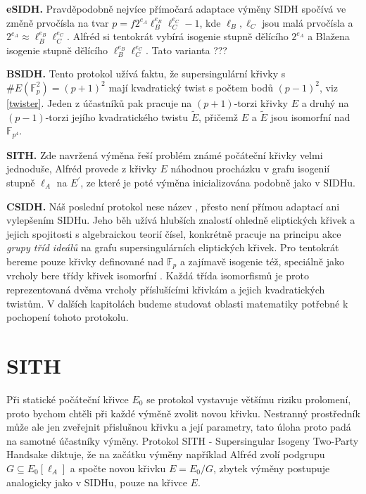 \documentclass[12pt]{report}
\begin{document}
\textbf{eSIDH.} \cite{eSIDH} Pravděpodobně nejvíce přímočará adaptace výměny SIDH spočívá ve změně prvočísla na tvar $p = f 2^{e_A} \ell_B ^{e_B} \ell_C ^{e_C} - 1$, kde $\ell_B,\ell_C$ jsou malá prvočísla a $2^{e_A} \approx \ell_B ^{e_B} \ell_C ^{e_C}$. Alfréd si tentokrát vybírá isogenie stupně dělícího $2^{e_A}$ a Blažena isogenie stupně dělícího $\ell_B ^{e_B} \ell_C ^{e_C}$. Tato varianta ???

\textbf{BSIDH.} \cite{BSIDH} Tento protokol užívá faktu, že supersingulární křivky s $\#E(\mathbb{F}_p^2) = (p+1)^2$ mají kvadratický twist s počtem bodů $(p-1)^2$, viz \ref{twister}. Jeden z účastníků pak pracuje na $(p+1)$-torzi křivky $E$ a druhý na $(p-1)$-torzi jejího kvadratického twistu $\tilde{E}$, přičemž $E$ a $\tilde{E}$ jsou isomorfní nad $\mathbb{F}_{p^4}$.

\textbf{SITH.} \cite{Dark} Zde navržená výměna řeší problém známé počáteční křivky velmi jednoduše, Alfréd provede z křivky $E$ náhodnou procházku v grafu isogenií stupně $\ell_A$ na $E^\prime$, ze které je poté výměna inicializována podobně jako v SIDHu.

\textbf{CSIDH.} \cite{CSIDH} Náš poslední protokol nese název , přesto není přímou adaptací ani vylepšením SIDHu. Jeho běh užívá hlubších znalostí ohledně eliptických křivek a jejich spojitosti s algebraickou teorií čísel, konkrétně pracuje na principu akce \textit{grupy tříd ideálů} na grafu supersingulárních eliptických křivek. Pro tentokrát bereme pouze křivky definované nad $\mathbb{F}_p$ a zajímavě isogenie též, speciálně jako vrcholy bere třídy křivek isomorfní . Každá třída isomorfismů je proto reprezentovaná dvěma vrcholy příslušícími křivkám a jejich kvadratických twistům. V dalších kapitolách budeme studovat oblasti matematiky potřebné k pochopení tohoto protokolu.

\section{SITH}

Při statické počáteční křivce $E_0$ se protokol vystavuje většímu riziku prolomení, proto bychom chtěli při každé výměně zvolit novou křivku. Nestranný prostředník může ale jen zveřejnit přislušnou křivku a její parametry, tato úloha proto padá na samotné účastníky výměny. Protokol SITH - Supersingular Isogeny Two-Party Handsake diktuje, že na začátku výměny například Alfréd zvolí podgrupu $G \subseteq E_0 [\ell_A]$ a spočte novou křivku $E = E_0/G$, zbytek výměny postupuje analogicky jako v SIDHu, pouze na křivce $E$.
\end{document}
